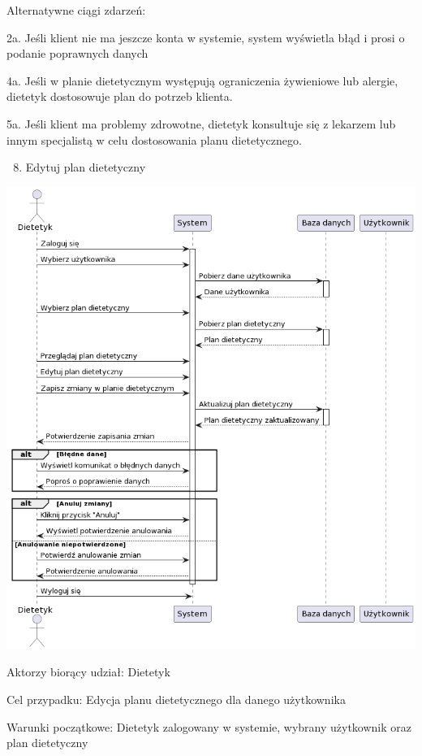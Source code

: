 \documentclass[
]{article}
\providecommand{\tightlist}{%
  \setlength{\itemsep}{0pt}\setlength{\parskip}{0pt}}
\begin{document}
{Alternatywne ciągi zdarzeń:}

{2a. Jeśli klient nie ma jeszcze konta w systemie, system wyświetla błąd
i prosi o podanie poprawnych danych}

{4a. Jeśli w planie dietetycznym występują ograniczenia żywieniowe lub
alergie, dietetyk dostosowuje plan do potrzeb klienta.}

{5a. Jeśli klient ma problemy zdrowotne, dietetyk konsultuje się z
lekarzem lub innym specjalistą w celu dostosowania planu dietetycznego.}

{}

\begin{enumerate}
\setcounter{enumi}{7}
\tightlist
\item
  {Edytuj plan dietetyczny}
\end{enumerate}

{\includegraphics{diagrams/sequence/dietetyk_edytuj_plan.png}}

{Aktorzy biorący udział: Dietetyk}

{Cel przypadku: Edycja planu dietetycznego dla danego użytkownika}

{Warunki początkowe: Dietetyk zalogowany w systemie, wybrany użytkownik
oraz plan dietetyczny}
\end{document}
